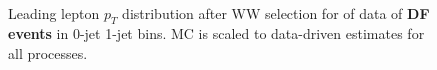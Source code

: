 \begin{figure}[!hbtp]
\centering
{}
\\
\caption{Leading lepton $p_T$ distribution after WW selection for \intlumiEightTeV of data 
of {\bf DF events} in 0-jet  1-jet  bins.  
MC is scaled to data-driven estimates for all processes.}
\label{fig:ww_ptmax}
\end{figure}

